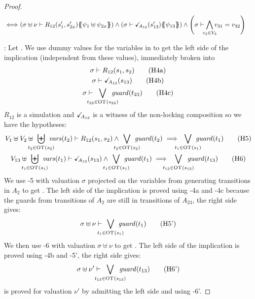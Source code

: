 \documentclass{article}
\begin{document}
\begin{proof}
\begin{align*}
		\iff & \mpar{\sigma \uplus \nu \vdash R_{12}\mpar{s'_1, s'_{2x}}\psubst{\psi_1 \uplus \psi_{2x}}} \wedge \mpar{\sigma \vdash \reach{A_{13}}\mpar{s'_{13}}\psubst{\psi_{13}}} \wedge \mpar{\sigma \vdash \bigwedge_\subbox{v_3 \in V_3} v_{31} = v_{32}}
	\end{align*}
\item[\goal{1}:] Let .
	We use dummy values for the variables in  to get the left side of the implication (independent from these values), immediately broken into
	\begin{gather}
		\sigma \vdash R_{12}\mpar{s_1, s_2} \hyp{4a} \\
		\sigma \vdash \reach{A_{13}}\mpar{s_{13}} \hyp{4b} \\
		\sigma \vdash \bigvee_\subbox{t_{23} \in \fOT{s_{23}}} \fguard{t_{23}} \hyp{4c}
	\end{gather}
	\(R_{12}\) is a simulation and \(\checkmark_{\!\! A_{13}}\) is a witness of the non-locking composition so we have the hypotheses:
	\begin{gather}
		V_1 \uplus V_2 \uplus \biguplus_\subbox{t_2 \in \fOT{s_2}} \fvars{t_2} \vdash R_{12}\mpar{s_1, s_2} \wedge \bigvee_\subbox{t_2 \in \fOT{s_2}} \fguard{t_2} \implies \bigvee_\subbox{t_1 \in \fOT{s_1}} \fguard{t_1} \hyp{5} \\
		V_{13} \uplus \biguplus_\subbox{t_1 \in \fOT{s_1}} \fvars{t_1} \vdash \reach{A_{13}}\mpar{s_{13}} \wedge \bigvee_\subbox{t_1 \in \fOT{s_1}} \fguard{t_1} \implies \bigvee_\subbox{t_{13} \in \fOT{s_{13}}} \fguard{t_{13}} \hyp{6}
	\end{gather}
	We use \hyp{5} with valuation \(\sigma\) projected on the variables from generating transitions in \(A_2\) to get .
	The left side of the implication is proved using \hyp{4a} and \hyp{4c} because the guards from transitions of \(A_2\) are still in transitions of \(A_{23}\), the right side gives:
	\[ \sigma \uplus \nu \vdash \bigvee_\subbox{t_1 \in \fOT{s_1}} \fguard{t_1} \hyp{5'} \]
	We then use \hyp{6} with valuation \(\sigma \uplus \nu\) to get .
	The left side of the implication is proved using \hyp{4b} and \hyp{5'}, the right side gives:
	\[ \sigma \uplus \nu' \vdash \bigvee_\subbox{t_{13} \in \fOT{s_{13}}} \fguard{t_{13}} \hyp{6'} \]
	 is proved for valuation \(\nu'\) by admitting the left side and using \hyp{6'}.
\end{proof}
\end{document}
